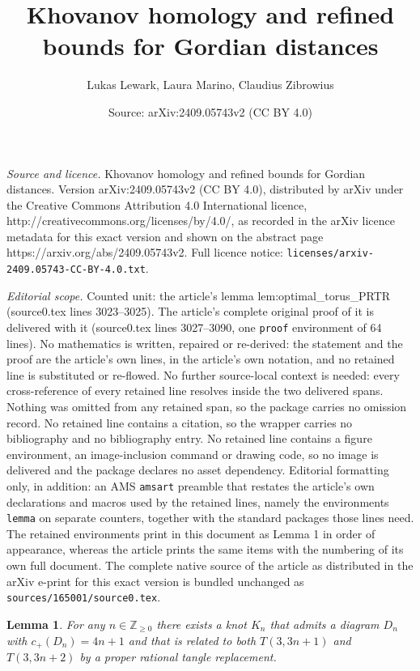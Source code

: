 \documentclass[10pt,a4paper]{amsart}
\title{Khovanov homology \break and refined bounds for Gordian distances}
\author{Lukas Lewark, Laura Marino, Claudius Zibrowius}
\date{Source: arXiv:2409.05743v2 (CC BY 4.0)}
\newtheorem{lemma}{Lemma}
\newcommand{\Z}{\mathbb{Z}}
\begin{document}
\maketitle

\noindent\emph{Source and licence.} Khovanov homology \break and refined bounds for Gordian distances. Version arXiv:2409.05743v2 (CC BY 4.0), distributed by arXiv under the Creative Commons Attribution 4.0 International licence, http://creativecommons.org/licenses/by/4.0/, as recorded in the arXiv licence metadata for this exact version and shown on the abstract page https://arxiv.org/abs/2409.05743v2. Full licence notice: \texttt{licenses/arxiv-2409.05743-CC-BY-4.0.txt}.\par\smallskip

\noindent\textit{Editorial scope.} Counted unit: the article's lemma lem:optimal\_torus\_PRTR (source0.tex lines 3023--3025). The article's complete original proof of it is delivered with it (source0.tex lines 3027--3090, one \texttt{proof} environment of 64 lines). No mathematics is written, repaired or re-derived: the statement and the proof are the article's own lines, in the article's own notation, and no retained line is substituted or re-flowed.  No further source-local context is needed: every cross-reference of every retained line resolves inside the two delivered spans.  Nothing was omitted from any retained span, so the package carries no omission record.  No retained line contains a citation, so the wrapper carries no bibliography and no bibliography entry.  No retained line contains a figure environment, an image-inclusion command or drawing code, so no image is delivered and the package declares no asset dependency.  Editorial formatting only, in addition: an AMS \texttt{amsart} preamble that restates the article's own declarations and macros used by the retained lines, namely the environments \texttt{lemma} on separate counters, together with the standard packages those lines need.  The retained environments print in this document as Lemma 1 in order of appearance, whereas the article prints the same items with the numbering of its own full document.  The complete native source of the article as distributed in the arXiv e-print for this exact version is bundled unchanged as \texttt{sources/165001/source0.tex}.
\begin{lemma}\label{lem:optimal_torus_PRTR}
	For any \(n\in\Z_{\geq 0}\) there exists a knot \(K_n\) that admits a diagram \(D_n\) with \(c_+(D_n)=4n+1\) and that is related to both \(T(3,3n+1)\) and \(T(3,3n+2)\) by a proper rational tangle replacement.
\end{lemma}
\end{document}
